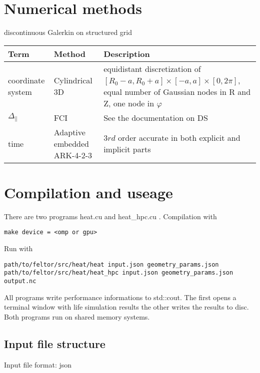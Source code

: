 \section{Numerical methods}
discontinuous Galerkin on structured grid
\begin{longtable}{ll>{\RaggedRight}p{7cm}}
\toprule
\rowcolor{gray!50}\textbf{Term} &  \textbf{Method} & \textbf{Description}  \\ \midrule
coordinate system & Cylindrical 3D & equidistant discretization of $[R_0-a,R_0+a] \times [-a,a] \times [0,2\pi]$, equal number of Gaussian nodes in R and Z, one node in $\varphi$ \\
$\Delta_\parallel$ & FCI & See the documentation on DS\\
time &  Adaptive embedded ARK-4-2-3 & $3rd$ order accurate in both
explicit and implicit parts\\
\bottomrule
\end{longtable}

\section{Compilation and useage}
There are two programs heat.cu and heat\_hpc.cu . Compilation with
\begin{verbatim}
make device = <omp or gpu>
\end{verbatim}
Run with
\begin{verbatim}
path/to/feltor/src/heat/heat input.json geometry_params.json
path/to/feltor/src/heat/heat_hpc input.json geometry_params.json output.nc
\end{verbatim}
All programs write performance informations to std::cout.
The first opens a terminal window with life simulation results
the
other writes the results to disc. Both programs run on shared memory
systems.

\subsection{Input file structure}
Input file format: json

